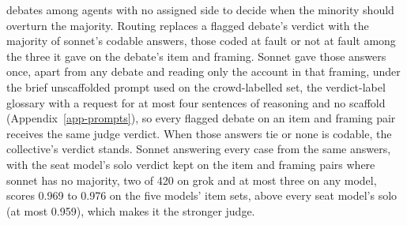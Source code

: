 debates among agents with no assigned side to decide when the minority
should overturn the majority.
Routing replaces a flagged debate's verdict with the majority of sonnet's
codable answers, those coded at fault or not at fault among the three it
gave on the debate's item and framing. Sonnet gave those answers once, apart
from any debate and reading only the account in that framing, under the
brief unscaffolded prompt used on the crowd-labelled set, the verdict-label
glossary with a request for at most four sentences of reasoning and no
scaffold (Appendix~\ref{app-prompts}), so every flagged debate on an item
and framing pair receives the same judge verdict. When those answers tie or
none is codable, the collective's verdict stands. Sonnet
answering every case from the same answers, with the seat model's solo
verdict kept on the item and framing pairs where sonnet has no majority, two
of 420 on grok and at most three on
any model, scores 0.969 to 0.976 on the five models' item sets,
above every seat model's solo (at most 0.959), which makes it the stronger
judge.
